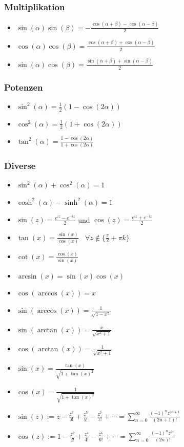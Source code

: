 \documentclass[8pt]{article}
\begin{document}
\begin{multicols*}{3}
\subsubsection{Multiplikation}
\begin{itemize}
 \item $\sin(\alpha) \sin(\beta) = -\frac{\cos(\alpha + \beta) - \cos(\alpha - \beta)}{2}$
 \item $\cos(\alpha) \cos(\beta) =  \frac{\cos(\alpha + \beta) + \cos(\alpha - \beta)}{2}$
 \item $\sin(\alpha) \cos(\beta) =  \frac{\sin(\alpha + \beta) + \sin(\alpha - \beta)}{2}$
\end{itemize}

\subsubsection{Potenzen}
\begin{itemize}
 \item $\sin^2(\alpha) = \frac{1}{2}(1-\cos(2\alpha))$
 \item $\cos^2(\alpha) = \frac{1}{2}(1+\cos(2\alpha))$
 \item $\tan^2(\alpha) = \frac{1-\cos(2\alpha)}{1+\cos(2\alpha)}$
\end{itemize}

\subsubsection{Diverse}

\begin{itemize}
 \item $\sin^2(\alpha) + \cos^2(\alpha) = 1$
 \item $\cosh^2(\alpha) - \sinh^2(\alpha) = 1$
 \item $\sin(z) = \frac{e^{iz} - e^{-iz}}{2}$ und $\cos(z) = \frac{e^{iz} + e^{-iz}}{2}$
 \item $\tan(x) = \frac{\sin(x)}{\cos(x)} \;\;\; \forall z \not \in \{\frac{\pi}{2} + \pi k\}$
 \item $\cot(x) = \frac{\cos(x)}{\sin(x)}$
 \item $\arcsin(x) = \sin(x)\cos(x)$
 \item $\cos(\arccos(x)) = x$
 \item $\sin(\arccos(x)) = \frac{1}{\sqrt{1 - x^2}}$
 \item $\sin(\arctan(x)) = \frac{x}{\sqrt{x^2 + 1}}$
 \item $\cos(\arctan(x)) = \frac{1}{\sqrt{x^2 + 1}}$
 \item $\sin(x) = \frac{\tan(x)}{\sqrt{1 + \tan(x)^2}}$
 \item $\cos(x) = \frac{1}{\sqrt{1 + \tan(x)^2}}$
 \item $\sin(z) := z - \frac{z^3}{3!} + \frac{z^5}{5!} - \frac{z^7}{7!} + \cdots = \sum_{n = 0}^\infty \frac{(-1)^n z^{2n + 1}}{(2n+1)!}$
  \item $\cos(z) := 1 - \frac{z^2}{2!} + \frac{z^4}{4!} - \frac{z^6}{6!} + \cdots = \sum_{n = 0}^\infty \frac{(-1)^n z^{2n}}{(2n)!}$
\end{itemize}



\end{multicols*}
\end{document}
